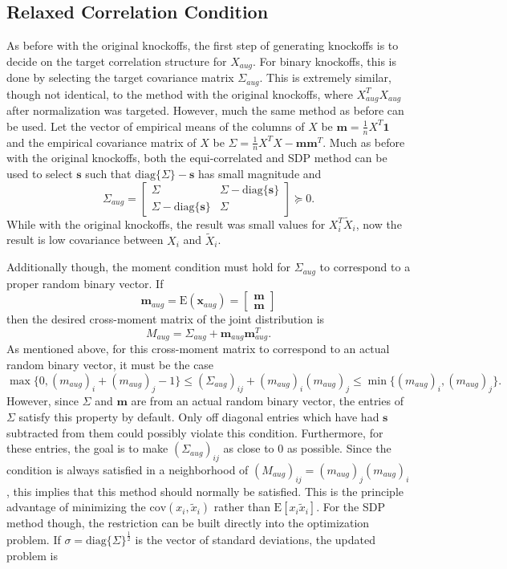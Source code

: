 \documentclass[11pt]{article}
\newcommand{\E}{\mathrm{E}}
\newcommand{\diag}[1]{\mathrm{diag}\{#1\}}
\theoremstyle{definition}
\begin{document}
\subsection{Relaxed Correlation Condition}
As before with the original knockoffs, the first step of generating knockoffs is to decide on the target correlation structure for $X_{aug}$. For binary knockoffs, this is done by selecting the target covariance matrix $\Sigma_{aug}$. This is extremely similar, though not identical, to the method with the original knockoffs, where $X_{aug}^TX_{aug}$ after normalization was targeted. However, much the same method as before can be used. Let the vector of empirical means of the columns of $X$ be $\mathbf m = \frac{1}{n}X^T\mathbf 1$ and the empirical covariance matrix of $X$ be $\Sigma = \frac{1}{n}X^TX - \mathbf{m}\mathbf{m}^T$. Much as before with the original knockoffs, both the equi-correlated and SDP method can be used to select  $\mathbf s$  such that $\diag{\Sigma}-\mathbf s$ has small magnitude and 
        \[ \Sigma_{aug} = \left[\begin{array}{cc}  \Sigma & \Sigma - \diag{\mathbf s }\\ \Sigma - \diag{\mathbf s} & \Sigma \end{array}\right] \succeq 0. \]
    While with the original knockoffs, the result was small values for $X_i^T\tilde X_i$, now the result is low covariance between $X_i$ and $\tilde X_i$.\par
    Additionally though, the moment condition must hold for $\Sigma_{aug}$ to correspond to a proper random binary vector. If 
    \[\mathbf m_{aug} = \E\left(\mathbf x_{aug}\right) = \left[\begin{array}{c}\mathbf m \\ \mathbf m \end{array}\right] \]
    then the desired cross-moment matrix of the joint distribution is 
        \[ M_{aug} = \Sigma_{aug} + \mathbf m_{aug}\mathbf m_{aug}^T.\]
        As mentioned above, for this cross-moment matrix to correspond to an actual random binary vector, it must be the case  
        \[\max\{0,(m_{aug})_i + ( m_{aug})_j -1\} \leq (\Sigma_{aug})_{ij} +  (m_{aug})_i  (m_{aug})_j \leq \min\{( m_{aug})_i, ( m_{aug})_j\}. \]
    However, since $\Sigma$ and $\mathbf m$ are from an actual random binary vector, the entries of $\Sigma$ satisfy this property by default. Only off diagonal entries which have had $\mathbf s$ subtracted from them could possibly violate this condition. Furthermore, for these entries, the goal is to make $(\Sigma_{aug})_{ij}$ as close to $0$ as possible. Since the condition is always satisfied in a neighborhood of $(M_{aug})_{ij} = (m_{aug})_j(m_{aug})_i$, this implies that this method should normally be satisfied. This is the principle advantage of minimizing the $\textrm{cov}(x_i,\tilde x_i)$ rather than $\E[x_i\tilde x_i]$. For the SDP method though, the restriction can be built directly into the optimization problem. If $\sigma = \diag{\Sigma}^{\frac{1}{2}}$ is the vector of standard deviations, the updated problem is
\end{document}
